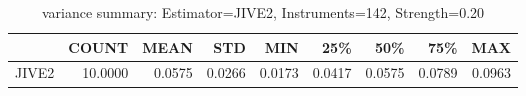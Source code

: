 \begin{table}[ht]
\centering
\caption{variance summary: Estimator=JIVE2, Instruments=142, Strength=0.20}
\begin{tabular}{lrrrrrrrr}
\toprule
 & COUNT & MEAN & STD & MIN & 25\% & 50\% & 75\% & MAX \\
\midrule
JIVE2 & 10.0000 & 0.0575 & 0.0266 & 0.0173 & 0.0417 & 0.0575 & 0.0789 & 0.0963 \\
\bottomrule
\end{tabular}
\end{table}
